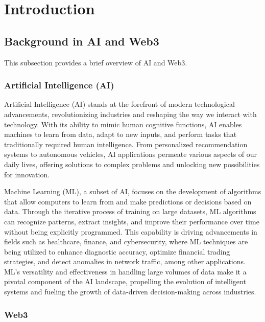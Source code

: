 \documentclass[conference]{IEEEtran}
\begin{document}


\section{Introduction}
\subsection{Background in AI and Web3}

This subsection provides a brief overview of AI and Web3.

\subsubsection{Artificial Intelligence (AI)}


Artificial Intelligence (AI) stands at the forefront of modern technological advancements, revolutionizing industries and reshaping the way we interact with technology. With its ability to mimic human cognitive functions, AI enables machines to learn from data, adapt to new inputs, and perform tasks that traditionally required human intelligence. From personalized recommendation systems to autonomous vehicles, AI applications permeate various aspects of our daily lives, offering solutions to complex problems and unlocking new possibilities for innovation.


Machine Learning (ML), a subset of AI, focuses on the development of algorithms that allow computers to learn from and make predictions or decisions based on data. Through the iterative process of training on large datasets, ML algorithms can recognize patterns, extract insights, and improve their performance over time without being explicitly programmed. This capability is driving advancements in fields such as healthcare, finance, and cybersecurity, where ML techniques are being utilized to enhance diagnostic accuracy, optimize financial trading strategies, and detect anomalies in network traffic, among other applications. ML's versatility and effectiveness in handling large volumes of data make it a pivotal component of the AI landscape, propelling the evolution of intelligent systems and fueling the growth of data-driven decision-making across industries.

\subsubsection{Web3}
\end{document}
